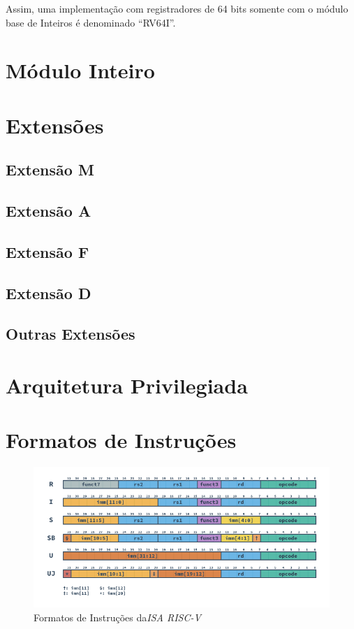 {
    Assim, uma implementação com registradores de 64 bits somente com o
    módulo base de Inteiros é denominado ``RV64I''.
}


\section{Módulo Inteiro}
{}


\section{Extensões}
    \subsection{Extensão M}
    {}


    \subsection{Extensão A}
    {}


    \subsection{Extensão F}
    {}


    \subsection{Extensão D}
    {}


    \subsection{Outras Extensões}
    {}

\section{Arquitetura Privilegiada}
{}


\section{Formatos de Instruções}
{}

\begin{figure}[H]
\centering
    \includegraphics[width=1\linewidth]{images/RV_Formats.png}
    \caption{Formatos de Instruções da\textit{ISA RISC-V}
        }\label{fig:riscv_formats}
\end{figure}



